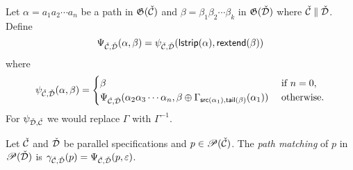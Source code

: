 Let $\alpha = a_1a_2 \dotsm a_n$ be a path in $\mathfrak{G}(\check{\mathcal{C}})$ and $\beta = \beta_1\beta_2\dotsm \beta_k$ in $\mathfrak{G}(\check{\mathcal{D}})$ where $\check{\mathcal{C}} \parallel \check{\mathcal{D}}$. Define
\[
    \Psi_{\check{\mathcal{C}},\check{\mathcal{D}}}(\alpha,\beta) = \psi_{\check{\mathcal{C}},\check{\mathcal{D}}}(\textsf{lstrip}(\alpha),\textsf{rextend}(\beta)) 
\]
where
\[
    \psi_{\check{\mathcal{C}},\check{\mathcal{D}}}(\alpha,\beta) = \begin{cases}
        \beta & \text{ if } n = 0,\\
        \Psi_{\check{\mathcal{C}},\check{\mathcal{D}}}(\alpha_2\alpha_3\dotsm\alpha_n, \beta \oplus \Gamma_{\textsf{src}(\alpha_1),\textsf{tail}(\beta)}(\alpha_1)) & \text{ otherwise}.
    \end{cases}
\]
For $\psi_{\check{\mathcal{D}},\check{\mathcal{C}}}$ we would replace $\Gamma$ with $\Gamma^{-1}$.

\begin{definition}\label{def:pathmatch}
Let $\check{\mathcal{C}}$ and $\check{\mathcal{D}}$ be parallel specifications and $p \in \mathscr{P}(\check{\mathcal{C}})$. The \emph{path matching} of $p$ in $\mathscr{P}(\check{\mathcal{D}})$ is $\gamma_{\check{\mathcal{C}},\check{\mathcal{D}}}(p) = \Psi_{\check{\mathcal{C}},\check{\mathcal{D}}}(p,\varepsilon)$.
\end{definition}

